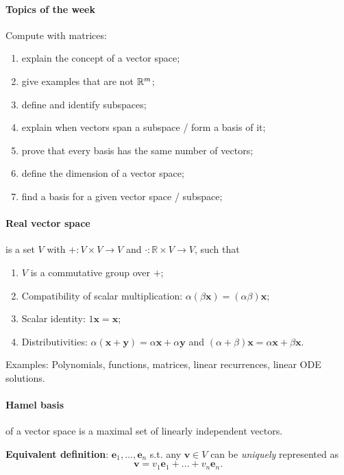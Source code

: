 \documentclass{article}
\begin{document}
\paragraph{Topics of the week} Compute with matrices:  

\begin{enumerate}
    \item explain the concept of a vector space;
    \item give examples that are not $\mathbb{R}^m$;
    \item define and identify subspaces;
    \item explain when vectors span a subspace / form a basis of it;
    \item prove that every basis has the same number of vectors;
    \item define the dimension of a vector space;
    \item find a basis for a given vector space / subspace;
\end{enumerate}

\paragraph{Real vector space} is a set $V$ with $+ : V \times V \to V$ and $\cdot : \mathbb R \times V \to V$, such that

\begin{enumerate}
    \item $V$ is a commutative group over $+$;
    \item Compatibility of scalar multiplication: $\alpha (\beta \mathbf x) = (\alpha \beta) \mathbf x$;
    \item Scalar identity: $1 \mathbf x = \mathbf x$;
    \item Distributivities: $\alpha(\mathbf x + \mathbf y) = \alpha \mathbf x + \alpha \mathbf y$ and $(\alpha + \beta) \mathbf x = \alpha \mathbf x + \beta \mathbf x$.
\end{enumerate}

Examples: Polynomials, functions, matrices, linear recurrences, linear ODE solutions.


\paragraph{Hamel basis} of a vector space is a maximal set of linearly independent vectors.

\textbf{Equivalent definition}: $\mathbf e_1, \dots, \mathbf e_n$ s.t. any $\mathbf v \in V$ can be \textit{uniquely} represented as
$$
\mathbf v = v_1 \mathbf e_1 + \dots + v_n \mathbf e_n.
$$
\end{document}
